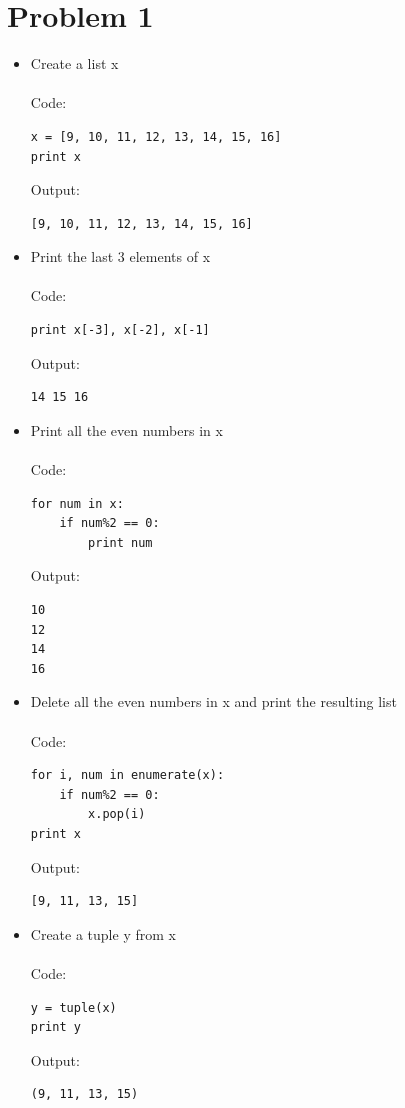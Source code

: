 \section*{Problem 1}
\begin{itemize}
\item Create a list x \\\\
Code: 
\begin{verbatim}
x = [9, 10, 11, 12, 13, 14, 15, 16]
print x
\end{verbatim}
Output: 
\begin{verbatim}
[9, 10, 11, 12, 13, 14, 15, 16]
\end{verbatim}


\item Print the last 3 elements of x \\\\
Code: 
\begin{verbatim}
print x[-3], x[-2], x[-1]
\end{verbatim}
Output: 
\begin{verbatim}
14 15 16
\end{verbatim}

\item Print all the even numbers in x \\\\
Code: 
\begin{verbatim}
for num in x:
    if num%2 == 0:
        print num
\end{verbatim}
Output: 
\begin{verbatim}
10
12
14
16
\end{verbatim}

\item Delete all the even numbers in x and print the resulting list \\\\
Code: 
\begin{verbatim}
for i, num in enumerate(x):
    if num%2 == 0:
        x.pop(i)
print x
\end{verbatim}
Output: 
\begin{verbatim}
[9, 11, 13, 15]
\end{verbatim}

\item Create a tuple y from x \\\\ 
Code: 
\begin{verbatim}
y = tuple(x)
print y
\end{verbatim}
Output: 
\begin{verbatim}
(9, 11, 13, 15)
\end{verbatim}


\end{itemize}
